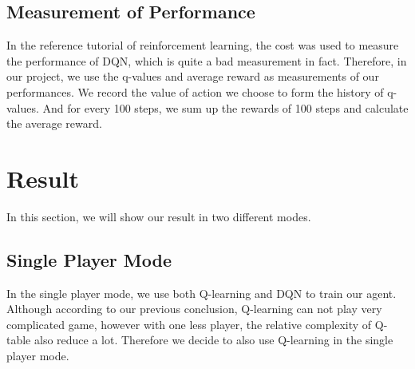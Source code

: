 \documentclass[12pt]{article}
\begin{document}
\subsection{Measurement of Performance}
In the reference tutorial of reinforcement learning, the cost was used to measure the performance of DQN, which is quite a bad measurement in fact. Therefore, in our project, we use the q-values and average reward as measurements of our performances. We record the value of action we choose to form the history of q-values. And for every 100 steps, we sum up the rewards of 100 steps and calculate the average reward.



\section{Result}

In this section, we will show our result in two different modes.

\subsection{Single Player Mode}

In the single player mode, we use both Q-learning and DQN to train our agent. Although according to our previous conclusion, Q-learning can not play very complicated game, however with one less player, the relative complexity of Q-table also reduce a lot. Therefore we decide to also use Q-learning in the single player mode.
\end{document}
